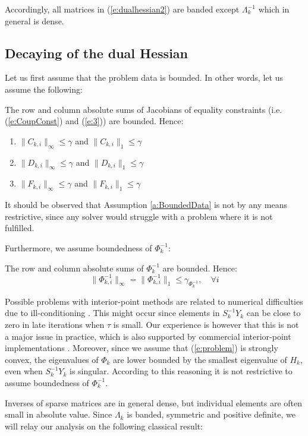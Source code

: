 Accordingly, all matrices in (\ref{e:dualhessian2}) are banded except $\Lambda_k^{-1}$ which in general is dense.

\subsection{Decaying of the dual Hessian} \label{S:TheoreticalDecay}
Let us first assume that the problem data is bounded. In other words, let us assume the following:
\begin{assumption} \label{a:BoundedData}
The row and column absolute sums of Jacobians of equality constraints (i.e. (\ref{e:CoupConst}) and (\ref{e:3})) are bounded. Hence:
\begin{enumerate}
\item $\| C_{k,i} \|_\infty \leq \gamma$ and $\| C_{k,i} \|_1 \leq \gamma$
\item $\| D_{k,i} \|_\infty \leq \gamma$ and $\| D_{k,i} \|_1 \leq \gamma$
\item $\| F_{k,i} \|_\infty \leq \gamma$ and $\| F_{k,i} \|_1 \leq \gamma$
\end{enumerate}
\end{assumption}
It should be observed that Assumption \ref{a:BoundedData} is not by any means restrictive, since any solver would struggle with a problem where it is not fulfilled. 

Furthermore, we assume boundedness of $\Phi_k^{-1}$:
\begin{assumption} \label{a:BoundedConditioning}
The row and column absolute sums of $\Phi_k^{-1}$ are bounded. Hence:
\begin{equation}
\| \Phi_{k,i}^{-1} \|_\infty = \| \Phi_{k,i}^{-1} \|_1 \leq \gamma_{\Phi_k^{-1}}, \quad \forall i
\end{equation}
\end{assumption}
Possible problems with interior-point methods are related to numerical difficulties due to ill-conditioning \cite{}. This might occur since elements in $S_k^{-1}Y_k$ can be close to zero in late iterations when $\tau$ is small. Our experience is however that this is not a major issue in practice, which is also supported by commercial interior-point implementations \cite{}. Moreover, since we assume that (\ref{e:problem}) is strongly convex, the eigenvalues of $\Phi_k$ are lower bounded by the smallest eigenvalue of $H_k$, even when $S_k^{-1}Y_k$ is singular. According to this reasoning it is not restrictive to assume boundedness of $\Phi_k^{-1}$.

Inverses of sparse matrices are in general dense, but individual elements are often small in absolute value. Since $\Lambda_k$ is banded, symmetric and positive definite, we will relay our analysis on the following classical result:

